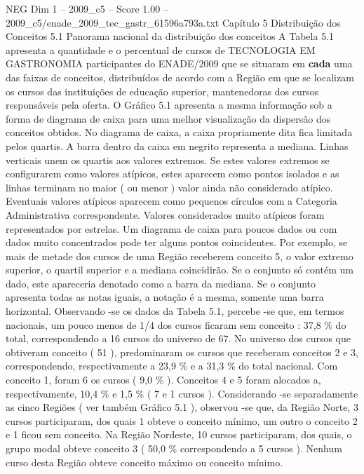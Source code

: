 \begin{textsample}{NEG Dim 1 – 2009\_c5 – Score 1.00 – 2009\_c5/enade\_2009\_tec\_gastr\_61596a793a.txt}  \label{ex:f1_neg_297}
Capítulo 5 Distribuição dos Conceitos 5.1 Panorama nacional da distribuição dos conceitos A Tabela 5.1 apresenta a quantidade e o percentual de cursos de TECNOLOGIA EM GASTRONOMIA participantes do ENADE/2009 que se situaram em \textbf{cada} uma das faixas de conceitos, distribuídos de acordo com a Região em que se localizam os cursos das instituições de educação superior, mantenedoras dos cursos responsáveis pela oferta.
O Gráfico 5.1 apresenta a mesma informação sob a forma de diagrama de caixa para uma melhor visualização da dispersão dos conceitos obtidos.
No diagrama de caixa, a caixa propriamente dita fica limitada pelos quartis.
A barra dentro da caixa em negrito representa a mediana.
Linhas verticais unem os quartis aos valores extremos.
Se estes valores extremos se configurarem como valores atípicos, estes aparecem como pontos isolados e as linhas terminam no maior ( ou menor ) valor ainda não considerado atípico.
Eventuais valores atípicos aparecem como pequenos círculos com a Categoria Administrativa correspondente.
Valores considerados muito atípicos foram representados por estrelas.
Um diagrama de caixa para poucos dados ou com dados muito concentrados pode ter alguns pontos coincidentes.
Por exemplo, se mais de metade dos cursos de uma Região receberem conceito 5, o valor extremo superior, o quartil superior e a mediana coincidirão.
Se o conjunto só contém um dado, este apareceria denotado como a barra da mediana.
Se o conjunto apresenta todas as notas iguais, a notação é a mesma, somente uma barra horizontal.
Observando -se os dados da Tabela 5.1, percebe -se que, em termos nacionais, um pouco menos de 1/4 dos cursos ficaram sem conceito : 37,8 \% do total, correspondendo a 16 cursos do universo de 67.
No universo dos cursos que obtiveram conceito ( 51 ), predominaram os cursos que receberam conceitos 2 e 3, correspondendo, respectivamente a 23,9 \% e a 31,3 \% do total nacional.
Com conceito 1, foram 6 os cursos ( 9,0 \% ).
Conceitos 4 e 5 foram alocados a, respectivamente, 10,4 \% e 1,5 \% ( 7 e 1 cursos ).
Considerando -se separadamente as cinco Regiões ( ver também Gráfico 5.1 ), observou -se que, da Região Norte, 3 cursos participaram, dos quais 1 obteve o conceito mínimo, um outro o conceito 2 e 1 ficou sem conceito.
Na Região Nordeste, 10 cursos participaram, dos quais, o grupo modal obteve conceito 3 ( 50,0 \% correspondendo a 5 cursos ).
Nenhum curso desta Região obteve conceito máximo ou conceito mínimo.

\end{textsample}
